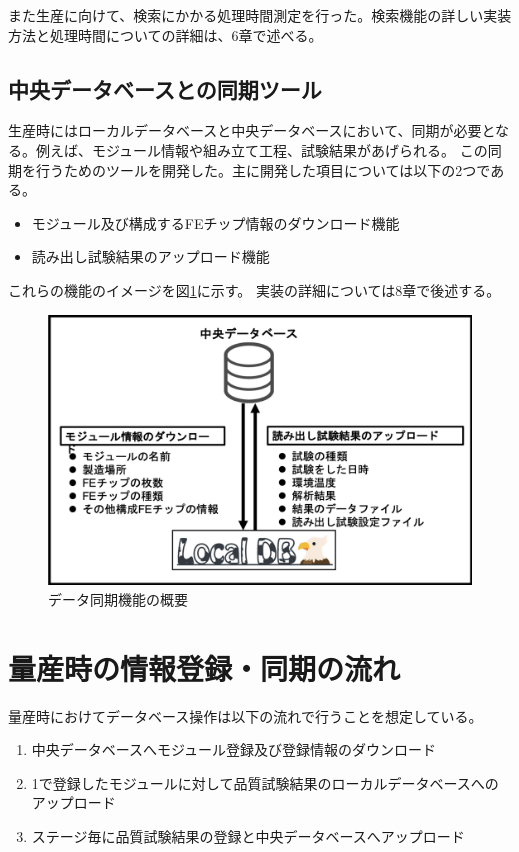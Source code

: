 また生産に向けて、検索にかかる処理時間測定を行った。検索機能の詳しい実装方法と処理時間についての詳細は、6章で述べる。

\newpage
\subsection{中央データベースとの同期ツール}
生産時にはローカルデータベースと中央データベースにおいて、同期が必要となる。例えば、モジュール情報や組み立て工程、試験結果があげられる。
この同期を行うためのツールを開発した。主に開発した項目については以下の2つである。

\begin{itemize}
  \item モジュール及び構成するFEチップ情報のダウンロード機能
  \item 読み出し試験結果のアップロード機能
\end{itemize}

これらの機能のイメージを図\ref{interface_overview}に示す。
実装の詳細については8章で後述する。

\begin{figure}[bpt]\centering
\includegraphics[width=12cm]{interface_overview}
\caption[データ同期機能の概要]{データ同期機能の概要}
\label{interface_overview}
\end{figure}

\newpage
\section{量産時の情報登録・同期の流れ}
量産時におけてデータベース操作は以下の流れで行うことを想定している。
\begin{enumerate}
  \item 中央データベースへモジュール登録及び登録情報のダウンロード
  \item 1で登録したモジュールに対して品質試験結果のローカルデータベースへのアップロード
  \item ステージ毎に品質試験結果の登録と中央データベースへアップロード
\end{enumerate}

